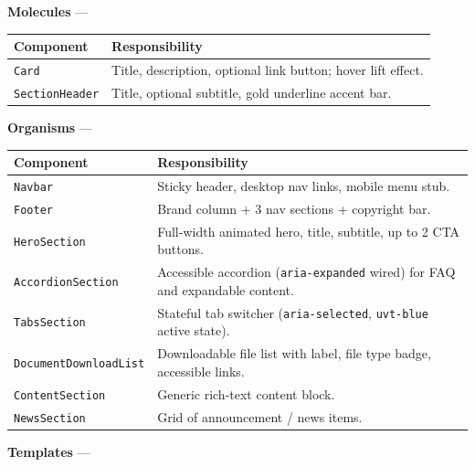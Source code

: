 \documentclass[12pt,a4paper]{article}
\begin{document}
\vspace{0.8em}
\noindent\textbf{Molecules} --- 
\vspace{0.4em}

\begin{longtable}{@{}L{3.6cm}L{9.6cm}@{}}
\toprule
{}
\textbf{Component} & \textbf{Responsibility} \\
\midrule
\endhead
\texttt{Card}
    & Title, description, optional link button; hover lift effect. \\
\addlinespace
\texttt{SectionHeader}
    & Title, optional subtitle, gold underline accent bar. \\
\bottomrule
\end{longtable}

\vspace{0.8em}
\noindent\textbf{Organisms} --- 
\vspace{0.4em}

\begin{longtable}{@{}L{3.8cm}L{9.4cm}@{}}
\toprule
{}
\textbf{Component} & \textbf{Responsibility} \\
\midrule
\endhead
\texttt{Navbar}
    & Sticky header, desktop nav links, mobile menu stub. \\
\addlinespace
\texttt{Footer}
    & Brand column + 3 nav sections + copyright bar. \\
\addlinespace
\texttt{HeroSection}
    & Full-width animated hero, title, subtitle, up to 2 CTA buttons. \\
\addlinespace
\texttt{AccordionSection}
    & Accessible accordion (\texttt{aria-expanded} wired) for FAQ and
      expandable content. \\
\addlinespace
\texttt{TabsSection}
    & Stateful tab switcher (\texttt{aria-selected}, \texttt{uvt-blue}
      active state). \\
\addlinespace
\texttt{DocumentDownloadList}
    & Downloadable file list with label, file type badge, accessible links. \\
\addlinespace
\texttt{ContentSection}
    & Generic rich-text content block. \\
\addlinespace
\texttt{NewsSection}
    & Grid of announcement / news items. \\
\bottomrule
\end{longtable}

\vspace{0.8em}
\noindent\textbf{Templates} --- 
\vspace{0.4em}
\end{document}
